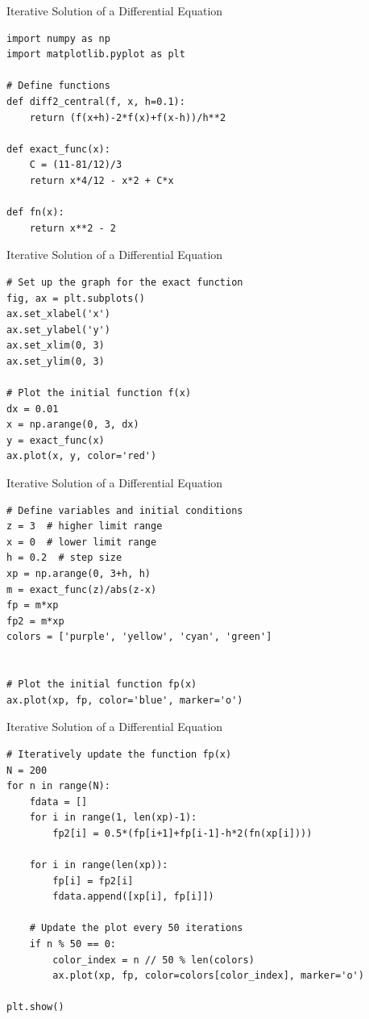 \documentclass{beamer}
\begin{document}
\begin{frame}[fragile]{Iterative Solution of a Differential Equation}
\begin{verbatim}
import numpy as np
import matplotlib.pyplot as plt

# Define functions
def diff2_central(f, x, h=0.1):
    return (f(x+h)-2*f(x)+f(x-h))/h**2

def exact_func(x):
    C = (11-81/12)/3
    return x*4/12 - x*2 + C*x

def fn(x):
    return x**2 - 2
\end{verbatim}
\end{frame}
\begin{frame}[fragile]{Iterative Solution of a Differential Equation}
\begin{verbatim}
# Set up the graph for the exact function
fig, ax = plt.subplots()
ax.set_xlabel('x')
ax.set_ylabel('y')
ax.set_xlim(0, 3)
ax.set_ylim(0, 3)

# Plot the initial function f(x)
dx = 0.01
x = np.arange(0, 3, dx)
y = exact_func(x)
ax.plot(x, y, color='red')

\end{verbatim}
\end{frame}
\begin{frame}[fragile]{Iterative Solution of a Differential Equation}
\begin{verbatim}
# Define variables and initial conditions
z = 3  # higher limit range
x = 0  # lower limit range
h = 0.2  # step size
xp = np.arange(0, 3+h, h)
m = exact_func(z)/abs(z-x)
fp = m*xp
fp2 = m*xp
colors = ['purple', 'yellow', 'cyan', 'green']


# Plot the initial function fp(x)
ax.plot(xp, fp, color='blue', marker='o')

\end{verbatim}
\end{frame}
\begin{frame}[fragile]{Iterative Solution of a Differential Equation}
\begin{verbatim}
# Iteratively update the function fp(x)
N = 200
for n in range(N):
    fdata = []
    for i in range(1, len(xp)-1):
        fp2[i] = 0.5*(fp[i+1]+fp[i-1]-h*2(fn(xp[i])))

    for i in range(len(xp)):
        fp[i] = fp2[i]
        fdata.append([xp[i], fp[i]])

    # Update the plot every 50 iterations
    if n % 50 == 0:
        color_index = n // 50 % len(colors)
        ax.plot(xp, fp, color=colors[color_index], marker='o')

plt.show()
\end{verbatim}
\end{frame}
\end{document}
